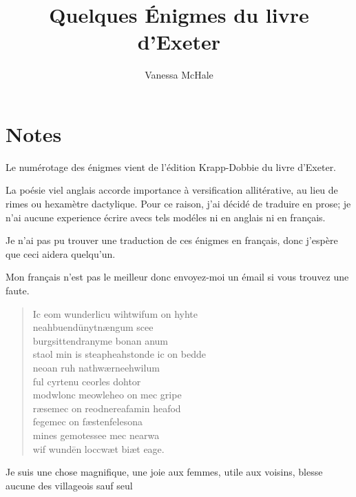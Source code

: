 \documentclass{article}
\newcommand{\attrib}[1]{%
\nopagebreak{\raggedleft\footnotesize #1\par}}
\begin{document}
\title{Quelques \'Enigmes du livre d'Exeter}
\author{Vanessa McHale}
\maketitle

\section*{Notes}
Le num\'erotage des \'enigmes vient de l'\'edition Krapp-Dobbie du livre d'Exeter.

La po\'esie viel anglais accorde importance \`a versification allit\'erative, au lieu de rimes ou hexam\`etre dactylique. Pour ce raison, j'ai d\'ecid\'e de traduire en prose; je n'ai aucune experience \'ecrire avecs tels mod\'eles ni en anglais ni en fran\c{c}ais. 

Je n'ai pas pu trouver une traduction de ces \'enigmes en fran\c{c}ais, donc j'esp\`ere que ceci aidera quelqu'un. 

Mon fran\c{c}ais n'est pas le meilleur donc envoyez-moi un \'email si vous trouvez une faute. 

\begin{verse}
Ic eom wunderlicu wiht\qquad     wifum on hyhte\\
neahbuend\=unyt\qquad     n\ae ngum sce\th\th e\\
burgsittendra\qquad     nym\th e bonan anum\\
sta\th ol min is steapheah\qquad     stonde ic on bedde\\
neo\th an ruh nathw\ae r\qquad     ne\th e\dh hwilum\\
ful cyrtenu \qquad     ceorles dohtor\\
modwlonc meowle\qquad     \TH  heo on mec gripe\dh\\
r\ae se\dh mec on reodne\qquad     reafa\dh min heafod\\
fege\dh mec on f\ae sten\qquad     fele\th sona\\
mines gemotes\qquad     se\th e mec nearwa\dh\\
wif wund\=en locc\qquad     w\ae t bi\dh \th\ae t eage.
\end{verse}
\attrib{Livre d'Exeter}

Je suis une chose magnifique,    une joie aux femmes,
utile aux voisins,    blesse aucune
des villageois    sauf seul 
\end{document}
